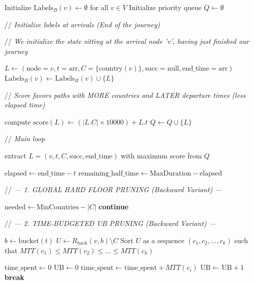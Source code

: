 \documentclass{article}
\newcommand{\CommentLine}[1]{
    \State // \textit{#1}
}
\begin{document}
\begin{algorithmic}[1]
    \State Initialize $\text{Labels}_B(v) \leftarrow \emptyset$ for all $v \in V$
    \State Initialize priority queue $Q \leftarrow \emptyset$ 

    \vspace{0.5em}
    \CommentLine{Initialize labels at arrivals (End of the journey)}
            \CommentLine{We initialize the state sitting at the arrival node 'v', having just finished our journey}
            \State $L \leftarrow (\text{node}=v, t=\text{arr}, C=\{\text{country}(v)\}, \text{succ}=\text{null}, \text{end\_time}=\text{arr})$
            \State $\text{Labels}_B(v) \leftarrow \text{Labels}_B(v) \cup \{L\}$
            \CommentLine{Score favors paths with MORE countries and LATER departure times (less elapsed time)}
            \State compute $\text{score}(L) \leftarrow (|L.C| \times 10000) + L.t$
            \State $Q \leftarrow Q \cup \{L\}$
        \EndFor
    \EndFor

    \vspace{0.5em}
    \CommentLine{Main loop}
        \State extract $L=(v,t,C,\text{succ},\text{end\_time})$ with maximum score from $Q$

        \State $\text{elapsed} \leftarrow \text{end\_time} - t$
        \State $\text{remaining\_half\_time} \leftarrow \text{MaxDuration} - \text{elapsed}$

        \vspace{0.5em}
        \CommentLine{--- 1. GLOBAL HARD FLOOR PRUNING (Backward Variant) ---}
        \State $\text{needed} \leftarrow \text{MinCountries} - |C|$
            \State \textbf{continue}
        \EndIf

        \vspace{0.5em}
        \CommentLine{--- 2. TIME-BUDGETED UB PRUNING (Backward Variant) ---}
            \State $b \leftarrow \text{bucket}(t)$
            \State $U \leftarrow R_{\text{back}}(v,b) \setminus C$
            \State Sort $U$ as a sequence $(c_1, c_2, \ldots, c_k)$ such that $MTT(c_1) \le MTT(c_2) \le \ldots \le MTT(c_k)$

            \State $\text{time\_spent} \leftarrow 0$
            \State $\text{UB} \leftarrow 0$
                \State $\text{time\_spent} \leftarrow \text{time\_spent} + MTT(c_i)$
                    \State $\text{UB} \leftarrow \text{UB} + 1$
                \Else
                    \State \textbf{break}
                \EndIf
            \EndFor


\end{algorithmic}
\end{document}
